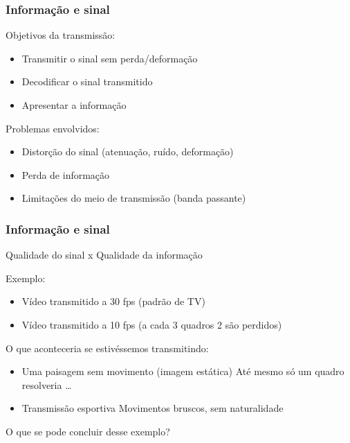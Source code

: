 \documentclass[xcolor]{beamer}
\begin{document}
\begin{frame}
    \frametitle{Informação e sinal}


    Objetivos da transmissão:

    \begin{itemize}
        \item Transmitir o sinal sem perda/deformação
        \item Decodificar o sinal transmitido
        \item Apresentar a informação
    \end{itemize}
    
    Problemas envolvidos:

    \begin{itemize}
        \item Distorção do sinal (atenuação, ruído, deformação)
        \item Perda de informação
        \item Limitações do meio de transmissão (banda passante)
    \end{itemize}
\end{frame}

\begin{frame}
    \frametitle{Informação e sinal}

    Qualidade do sinal x Qualidade da informação

    \vspace{0.25cm}

    Exemplo:

    \begin{itemize}
        \item Vídeo transmitido a 30 fps (padrão de TV)
        \item Vídeo transmitido a 10 fps (a cada 3 quadros 2 são perdidos)
    \end{itemize}

    O que aconteceria se estivéssemos transmitindo:

    \begin{itemize}
        \item Uma paisagem sem movimento (imagem estática) \implica Até mesmo só
              um quadro resolveria \ldots
        \item Transmissão esportiva \implica Movimentos bruscos, sem
              naturalidade
    \end{itemize}

    O que se pode concluir desse exemplo?
\end{frame}
\end{document}
